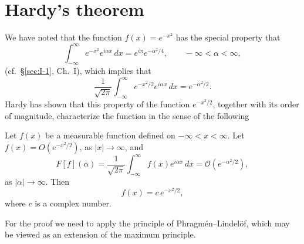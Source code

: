 \setcounter{section}{5}
\section{Hardy's theorem}
\label{sec:II-6}

We have noted that the function $f(x)=e^{-x^{2}}$ has the special property that
\[
\int_{-\infty}^{\infty}e^{-x^{2}}e^{i\alpha x}\,dx=e^{i\pi}e^{-\alpha^{2}/4},\qquad-\infty<\alpha<\infty,
\]
(cf.\ \S\ref{sec:I-1}, Ch.~I), which implies that
\[
\frac{1}{\sqrt{2\pi}}\int_{-\infty}^{\infty}e^{-x^{2}/2}e^{i\alpha x}\,dx=e^{-\alpha^{2}/2}.
\]
Hardy has shown that this property of the function $e^{-x^{2}/2}$, together with its order of magnitude, characterize the function in the sense of the following

\begin{theorem}\label{thm:II-9}
Let $f(x)$ be a measurable function defined on $-\infty<x<\infty$. Let $f(x)=O(e^{-x^{2}/2})$, as $|x|\to\infty$, and
\[
F[f](\alpha)=\frac{1}{\sqrt{2\pi}}\int_{-\infty}^{\infty}f(x)e^{i\alpha x}\,dx
=\mathcal O(e^{-\alpha^{2}/2}),
\]
as $|\alpha|\to\infty$. Then
\[
f(x)=c\,e^{-x^{2}/2},
\]
where $c$ is a complex number.
\end{theorem}

For the proof we need to apply the principle of Phragm\'en--Lindel\"of, which may be viewed as an extension of the maximum principle.

